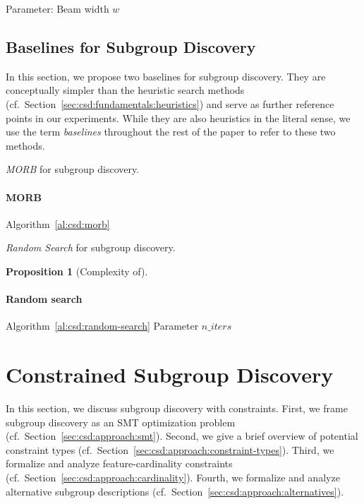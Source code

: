\documentclass{article}
\newtheorem{proposition}{Proposition}
\theoremstyle{definition}
\begin{document}
Parameter: Beam width $w$

\subsection{Baselines for Subgroup Discovery}
\label{sec:csd:fundamentals:baselines}

In this section, we propose two baselines for subgroup discovery.
They are conceptually simpler than the heuristic search methods (cf.~Section~\ref{sec:csd:fundamentals:heuristics}) and serve as further reference points in our experiments.
While they are also heuristics in the literal sense, we use the term  \emph{baselines} throughout the rest of the paper to refer to these two methods.

\begin{algorithm}[t]
	\DontPrintSemicolon
	\caption{\emph{MORB} for subgroup discovery.}
	\label{al:csd:morb}
\end{algorithm}

\paragraph{MORB}

Algorithm~\ref{al:csd:morb}

\begin{algorithm}[t]
	\DontPrintSemicolon
	\caption{\emph{Random Search} for subgroup discovery.}
	\label{al:csd:random-search}
\end{algorithm}

\begin{proposition}[Complexity of]
	\label{prop:csd:complexity-unconstrained-perfect-box}
\end{proposition}

\paragraph{Random search}

Algorithm~\ref{al:csd:random-search}
Parameter $n\_iters$

\section{Constrained Subgroup Discovery}
\label{sec:csd:approach}

In this section, we discuss subgroup discovery with constraints.
First, we frame subgroup discovery as an SMT optimization problem (cf.~Section~\ref{sec:csd:approach:smt}).
Second, we give a brief overview of potential constraint types (cf.~Section~\ref{sec:csd:approach:constraint-types}).
Third, we formalize and analyze feature-cardinality constraints (cf.~Section~\ref{sec:csd:approach:cardinality}).
Fourth, we formalize and analyze alternative subgroup descriptions (cf.~Section~\ref{sec:csd:approach:alternatives}).
\end{document}
